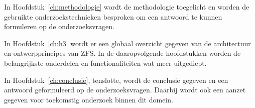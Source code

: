 In Hoofdstuk~\ref{ch:methodologie} wordt de methodologie toegelicht en worden de gebruikte onderzoekstechnieken besproken om een antwoord te kunnen formuleren op de onderzoeksvragen.

In Hoofdstuk~\ref{ch:h3} wordt er een globaal overzicht gegeven van de architectuur en ontwerpprincipes van ZFS. In de daaropvolgende hoofdstukken worden de belangrijkste onderdelen en functionaliteiten wat meer uitgediept. 

In Hoofdstuk~\ref{ch:conclusie}, tenslotte, wordt de conclusie gegeven en een antwoord geformuleerd op de onderzoeksvragen. Daarbij wordt ook een aanzet gegeven voor toekomstig onderzoek binnen dit domein.

